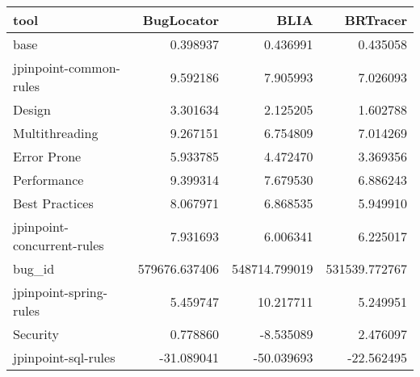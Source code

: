 \begin{tabular}{lrrr}
\toprule
tool &     BugLocator &           BLIA &       BRTracer \\
\midrule
base                       &       0.398937 &       0.436991 &       0.435058 \\
jpinpoint-common-rules     &       9.592186 &       7.905993 &       7.026093 \\
Design                     &       3.301634 &       2.125205 &       1.602788 \\
Multithreading             &       9.267151 &       6.754809 &       7.014269 \\
Error Prone                &       5.933785 &       4.472470 &       3.369356 \\
Performance                &       9.399314 &       7.679530 &       6.886243 \\
Best Practices             &       8.067971 &       6.868535 &       5.949910 \\
jpinpoint-concurrent-rules &       7.931693 &       6.006341 &       6.225017 \\
bug\_id                     &  579676.637406 &  548714.799019 &  531539.772767 \\
jpinpoint-spring-rules     &       5.459747 &      10.217711 &       5.249951 \\
Security                   &       0.778860 &      -8.535089 &       2.476097 \\
jpinpoint-sql-rules        &     -31.089041 &     -50.039693 &     -22.562495 \\
\bottomrule
\end{tabular}
